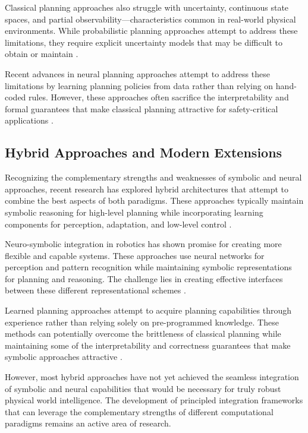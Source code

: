 Classical planning approaches also struggle with uncertainty, continuous state spaces, and partial observability—characteristics common in real-world physical environments. While probabilistic planning approaches attempt to address these limitations, they require explicit uncertainty models that may be difficult to obtain or maintain \cite{kaelbling1998planning}.

Recent advances in neural planning approaches attempt to address these limitations by learning planning policies from data rather than relying on hand-coded rules. However, these approaches often sacrifice the interpretability and formal guarantees that make classical planning attractive for safety-critical applications \cite{silver2016mastering}.

\subsection{Hybrid Approaches and Modern Extensions}

Recognizing the complementary strengths and weaknesses of symbolic and neural approaches, recent research has explored hybrid architectures that attempt to combine the best aspects of both paradigms. These approaches typically maintain symbolic reasoning for high-level planning while incorporating learning components for perception, adaptation, and low-level control \cite{sun2007hybrid}.

Neuro-symbolic integration in robotics has shown promise for creating more flexible and capable systems. These approaches use neural networks for perception and pattern recognition while maintaining symbolic representations for planning and reasoning. The challenge lies in creating effective interfaces between these different representational schemes \cite{garcez2023neurosymbolic}.

Learned planning approaches attempt to acquire planning capabilities through experience rather than relying solely on pre-programmed knowledge. These methods can potentially overcome the brittleness of classical planning while maintaining some of the interpretability and correctness guarantees that make symbolic approaches attractive \cite{silver2021reward}.

However, most hybrid approaches have not yet achieved the seamless integration of symbolic and neural capabilities that would be necessary for truly robust physical world intelligence. The development of principled integration frameworks that can leverage the complementary strengths of different computational paradigms remains an active area of research.

